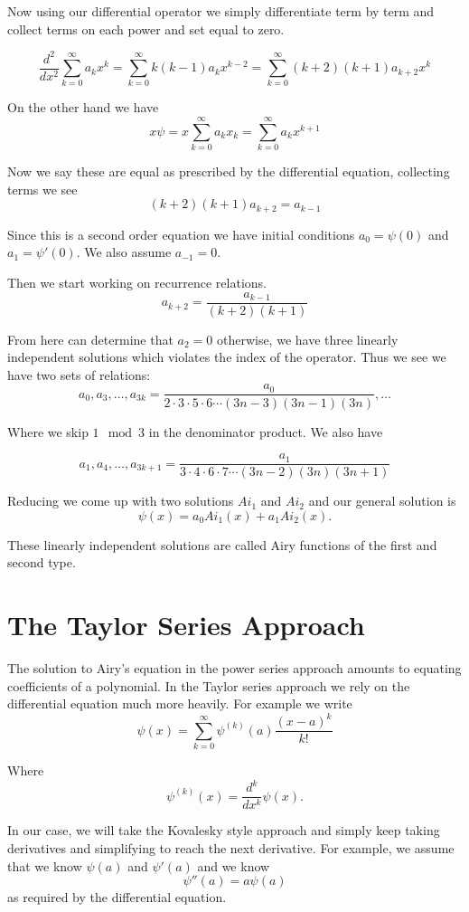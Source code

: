 \documentclass{amsart}
\theoremstyle{definition}
\theoremstyle{remark}
\numberwithin{equation}{section}
\begin{document}
Now using our differential operator we simply differentiate term by term and collect terms on each power and set equal to zero.

\[
\frac{d^2}{dx^2}\sum_{k=0}^{\infty} a_k x^k = \sum_{k=0}^{\infty} k(k-1)a_k x^{k-2} = \sum_{k=0}^{\infty} (k+2)(k+1)a_{k+2} x^k
\]


On the other hand we have
\[
x\psi = x\sum_{k=0}^{\infty} a_k x_k = \sum_{k=0}^{\infty} a_k x^{k+1}
\]


Now we say these are equal as prescribed by the differential equation, collecting terms we see
\[
(k+2)(k+1)a_{k+2} = a_{k-1}
\]

Since this is a second order equation we have initial conditions $a_0 = \psi(0)$ and $a_1 = \psi'(0)$. We also assume $a_{-1}=0$.

Then we start working on recurrence relations.
\[
a_{k+2} = \frac{a_{k-1}}{(k+2)(k+1)} 
\]

From here can determine that $a_2=0$ otherwise, we have three linearly independent solutions which violates the index of the operator.  Thus we see we have two sets of relations:
\[
a_0,a_3,\dots, a_{3k} = \frac{a_0}{2\cdot 3\cdot 5\cdot 6 \cdots (3n-3)(3n-1)(3n)},\dots
\]

Where we skip $1\mod 3$ in the denominator product.  We also have

\[
a_1,a_4,\dots, a_{3k+1} = \frac{a_1}{3\cdot 4 \cdot 6\cdot 7\cdots (3n-2)(3n)(3n+1)}
\]



Reducing we come up with two solutions $Ai_1$ and $Ai_2$ and our general solution is
\[
\psi(x) = a_0 Ai_1(x) + a_1 Ai_2(x).
\]

These linearly independent solutions are called Airy functions of the first and second type.



\section{The Taylor Series Approach}


The solution to Airy's equation in the power series approach amounts to equating coefficients of a polynomial.  In the Taylor series approach we rely on the differential equation much more heavily.  For example we write
\[
\psi(x) = \sum_{k=0}^{\infty} \psi^{(k)}(a) \frac{(x-a)^k}{k!}
\]


Where
\[
\psi^{(k)}(x) = \frac{d^k}{dx^k}\psi(x).
\]

In our case, we will take the Kovalesky style approach and simply keep taking derivatives and simplifying to reach the next derivative.  For example, we assume that we know $\psi(a)$ and $\psi'(a)$ and we know
\[
\psi''(a) = a\psi(a)
\]
as required by the differential equation.
\end{document}
